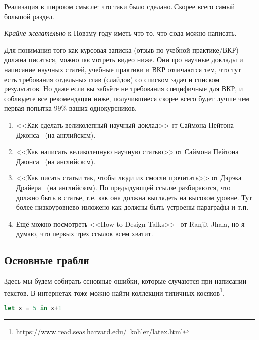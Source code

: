 
Реализация в широком смысле: что таки было сделано. Скорее всего самый большой раздел.

\emph{Крайне желательно} к Новому году иметь что-то, что сюда можно написать.

Для понимания того как курсовая записка (отзыв по учебной практике/ВКР) должна писаться, можно посмотреть видео ниже. Они про научные доклады и написание научных статей, учебные практики и ВКР отличаются тем, что тут есть требования отдельных глав (слайдов) со списком задач и списком результатов. Но даже если вы забьёте не требования специфичные для ВКР, и соблюдете все рекомендации ниже, получившиеся скорее всего будет лучше чем первая попытка 99\% ваших однокурсников.

\begin{enumerate}
\item <<Как сделать великолепный научный доклад>> от Саймона Пейтона Джонса~\cite{SPJGreatTalk} (на английском).
\item <<Как написать великолепную научную статью>> от Саймона Пейтона Джонса~\cite{SPJGreatPaper} (на английском).
\item <<Как писать статьи так, чтобы люди их смогли прочитать>> от Дэрэка Драйера~\cite{DreyerYoutube2020} (на английском). По предыдующей ссылке разбираются, что должно быть в статье, т.е. как она должна выглядеть на высоком уровне. Тут более низкоуровнево изложено как должны быть устроены параграфы и т.п.
\item Ещё можно посмотреть <<How to Design Talks>>~\cite{JhalaYoutube2020} от Ranjit Jhala, но я думаю, что первых трех ссылок всем хватит.
\end{enumerate}


\subsection{Основные грабли}
Здесь мы будем собирать основные ошибки, которые случаются при написании текстов. В интернетах тоже можно найти коллекции типичных косяков\footnote{\href{https://www.read.seas.harvard.edu/~kohler/latex.html}{https://www.read.seas.harvard.edu/~kohler/latex.html}}.


\begin{lstlisting}[caption={Название для листинга кода. Достаточно длинное, чтобы люди, которые смотрят картинка сразу после названия статьи (т.~е. все люди), смогли разобраться и понять к чему в статье листинги, картинки и прочий ``не текст''.}, language=Caml, frame=single]
let x = 5 in x+1
\end{lstlisting}

